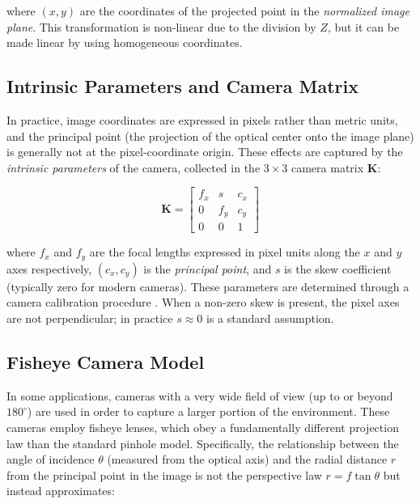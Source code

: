 \noindent where $(x, y)$ are the coordinates of the projected point in the
\textit{normalized image plane}. This transformation is non-linear due to the
division by $Z$, but it can be made linear by using homogeneous coordinates.





\subsection{Intrinsic Parameters and Camera Matrix}
\label{subsec:intrinsics}

In practice, image coordinates are expressed in pixels rather than metric units,
and the principal point (the projection of the optical center onto the image plane)
is generally not at the pixel-coordinate origin. These effects are captured by the
\textit{intrinsic parameters} of the camera, collected in the $3 \times 3$ camera
matrix $\mathbf{K}$:

\begin{equation}
    \mathbf{K} =
    \begin{bmatrix}
        f_x & s   & c_x \\
        0   & f_y & c_y \\
        0   & 0   & 1
    \end{bmatrix}
    \label{eq:camera_matrix}
\end{equation}

\noindent where $f_x$ and $f_y$ are the focal lengths expressed in pixel units
along the $x$ and $y$ axes respectively, $(c_x, c_y)$ is the
\textit{principal point}, and $s$ is the skew coefficient (typically zero for
modern cameras). These parameters are determined through a camera calibration
procedure \cite{zhang2000flexible}. When a non-zero skew is present, the pixel
axes are not perpendicular; in practice $s \approx 0$ is a standard assumption.

\subsection{Fisheye Camera Model}
\label{subsec:fisheye}

In some applications, cameras with a very wide field of view (up to or beyond
$180^{\circ}$) are used in order to capture a larger portion of the environment.
These cameras employ fisheye lenses, which obey a fundamentally different
projection law than the standard pinhole model. Specifically, the relationship
between the angle of incidence $\theta$ (measured from the optical axis) and
the radial distance $r$ from the principal point in the image is not the
perspective law $r = f\tan\theta$ but instead approximates:


